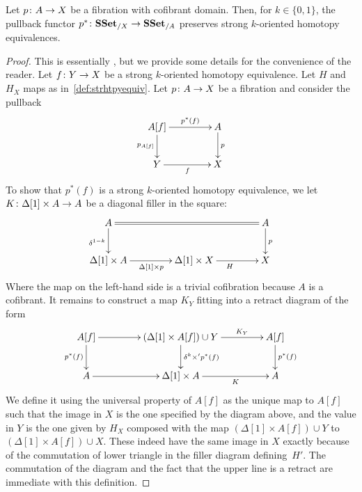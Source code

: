 \documentclass[reqno,10pt,a4paper,oneside,draft]{amsart}
\begin{document}



\begin{lemma} 
\label{lemma:pb_of_StrongHomotopyEq}
Let $p \colon A \rightarrow X$ be a fibration with cofibrant domain. Then, for $k \in \{0,1\}$, 
the pullback functor $p^* \colon \mathbf{SSet}_{/X} \to \mathbf{SSet}_{/A}$ preserves strong $k$-oriented homotopy equivalences.
\end{lemma}



\begin{proof} This is essentially \cite[Lemma~3.7]{gambino2017frobenius}, but we provide some details
for the convenience of the reader.
Let $f \colon Y \rightarrow X$ be a strong $k$-oriented homotopy equivalence. Let $H$ and $H_X$  maps 
as in~\cref{def:strhtpyequiv}. Let $p \colon A \rightarrow X$ be a fibration and consider the pullback
\[
\xymatrix@C=1.5cm{
A[f] \ar[r]^-{p^*(f)}  \ar[d]_{p_{A[f]}} & A \ar[d]^{p} \\
Y \ar[r]_{f} & X \\
}
\] 
To show that $p^*(f)$ is a strong $k$-oriented homotopy equivalence, we let $K \colon \Delta[1] \times A \rightarrow A$ be a diagonal filler in the square:
\[
\xymatrix@C=1.5cm{
A \ar[d]_{\delta^{1-k}} \ar@{=}[rr] & & A \ar[d]^p \\ 
\Delta[1] \times A \ar[r]_{\Delta[1] \times p}  & \Delta[1] \times X \ar[r]_H & X
}\]
Where the map on the left-hand side is a trivial cofibration because $A$ is a cofibrant.
It remains to construct a map $K_Y$  fitting into a retract diagram of the form
\[
\xymatrix@C=1.5cm{
A[f]  \ar[d]_{p^*(f)} \ar[r] &  (\Delta[1] \times A[f])  \cup Y \ar[d]^{\delta^k \times' p^*(f)} \ar[r]^-{K_Y} & A[f] \ar[d]^{p^*(f)} \\
A \ar[r] & \Delta[1]  \times A \ar[r]_-{K} & A
}
\]
We define it using the universal property of $A[f]$ as the unique map to $A[f]$ such that the image in $X$ is the one specified by the diagram above, and the value in $Y$ is the one given by $H_X$ composed with the map $(\Delta[1] \times A[f]) \cup Y$ to $(\Delta[1] \times A[f]) \cup X$. These indeed have the same image in $X$ exactly because of the commutation of lower triangle in the filler diagram defining~$H'$. The commutation of the diagram and the fact that the upper line is a retract are immediate with this definition.
\end{proof}
\end{document}

